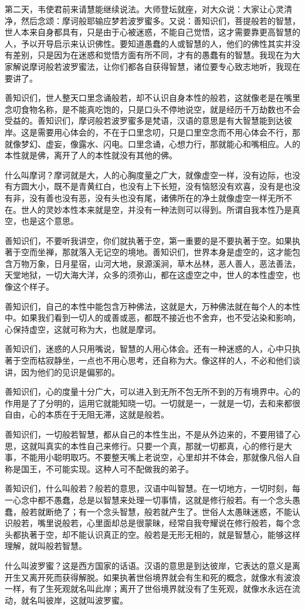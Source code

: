 \documentclass[12pt,twoside,openany]{book}
\newcommand{\kai}[1]{{\CJKfamily{kai}#1}}
\begin{document}
\kai{第二天，韦使君前来请慧能继续说法。大师登坛就座，对大众说：大家让心灵清净，然后念颂：摩诃般耶输应梦若波罗蜜多。又说：善知识们，菩提般若的智慧，世人本来自身都具有，只是由于心被迷惑，不能自己觉悟，这才需要靠更高智慧的人，予以开导启示来认识佛性。要知道愚蠢的人或智慧的人，他们的佛性其实并没有差别，只是因为在迷惑和觉悟方面有所不同，才有的愚蠢有的智慧。我现在为大家解说摩诃般若波罗蜜法，让你们都各自获得智慧，诸位要专心致志地听，我现在要讲了。
	
善知识们，世人整天口里念诵般若，却不认识自身本性的般若，这就像老是在嘴里念叨食物名称，是不能真吃饱的，只是口头不停地说空，就是经历千万劫数也不会受益的。善知识们，摩诃般若波罗蜜多是梵语，汉语的意思是有大智慧能到达彼岸。这是需要用心体会的，不在于口里念叨，只是口里空念而不用心体会不行，那就像梦幻、虚妄，像露水、闪电。口里念诵，心想力行，那就能心和嘴相应。人的本性就是佛，离开了人的本性就没有其他的佛。

什么叫摩诃？摩诃就是大，人的心胸度量之广大，就像虚空一样，没有边际，也没有方圆大小，既不是青黄红白，也没有上下长短，没有恼怒没有欢喜，没有是也没有非，没有善也没有恶，没有头也没有尾，诸佛所在的净土就像虚空一样无所不在。世人的灵妙本性本来就是空，并没有一种法则可以得到。所谓自我本性乃是真空，也是这个意思。

善知识们，不要听我讲空，你们就执著于空，第一重要的是不要执著于空。如果执著于空而坐禅，那就落入无记空的境地。善知识们，世界本身是虚空的，这才能包含万物万象，日月星宿，山河大地，泉源溪涧，草木丛林，恶人善人，恶法善法，天堂地狱，一切大海大洋，众多的须弥山，都在这虚空之中，世人的本性虚空，也像这个样子。

善知识们，自己的本性中能包含万种佛法，这就是大，万种佛法就在每个人的本性中。如果我们看到一切人的或善或恶，都既不接近也不舍弃，也不受沾染和影响，心保持虚空，这就可称为大，也就是摩诃。

善知识们，迷惑的人只用嘴说，智慧的人用心体会。还有一种迷惑的人，心中只执著于空而枯寂静坐，一点也不用心思考，还自称为大。像这样的人，不必和他们谈讲，因为他们的见识是偏邪的。

善知识们，心的度量十分广大，可以进入到无所不包无所不到的万有境界中。心的作用是了了分明的，运用它就能知晓一切。一切就是一，一就是一切，去和来都很自由，心的本质在于无阻无滞，这就是般若。

善知识们，一切般若智慧，都从自己的本性生出，不是从外边来的，不要用错了心思，这就叫真实的本性自己来修行。只要一个真，那就一切都真，心的修行是大事，不能用小聪明取巧。不要整天嘴上老说空，心里却并不体会，那就像凡俗人自称是国王，不可能实现。这种人可不配做我的弟子。

善知识们，什么叫般若？般若的意思，汉语中叫智慧。在一切地方，一切时刻，每一心念中都不愚蠢，总是以智慧来处理一切事情，这就是修行般若。有一个念头愚蠢，般若就断绝了；有一个念头智慧，般若就产生了。世俗人太愚昧迷惑，不能认识般若，嘴里说般若，心里面却总是很蒙昧，经常自我夸耀说在修行般若，每个念头都执著于空，却不能认识真正的空。般若是无形无相的，就是智慧心，能够这样理解，就叫般若智慧。

什么叫波罗蜜？这是西方国家的话语。汉语的意思是到达彼岸，它表达的意义是离开生又离开死而获得解脱。如果执著世俗境界就会有生和死的概念，就像水有波浪一样，有了生死观就名叫此岸；离开了世俗境界就没有了生死观，就像水永远在流动，就名叫彼岸，这就叫波罗蜜。}
\end{document}

